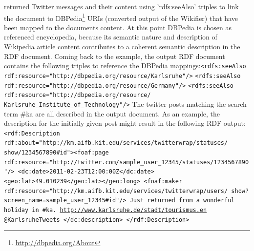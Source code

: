 \documentclass{llncs}
\begin{document}
\begin{enumerate}
returned Twitter messages and their content using 'rdfs:seeAlso' triples to link
the document to DBPedia\footnote{\url{http://dbpedia.org/About}} URIs (converted
output of the Wikifier) that have been mapped to the documents content.
At this point DBPedia is chosen as referenced encyclopedia, because its
semantic nature and description of Wikipedia article content contributes to a
coherent semantic description in the RDF document. \newline\linebreak Coming
back to the example, the output RDF document contains the following triples to reference the
DBPedia mappings:\newline\linebreak \texttt{<rdfs:seeAlso
rdf:resource="http://dbpedia.org/resource/Karlsruhe"/>}\newline
\texttt{<rdfs:seeAlso
rdf:resource="http://dbpedia.org/resource/Germany"/>}\newline
\texttt{<rdfs:seeAlso rdf:resource="http://dbpedia.org/resource/\newline
Karlsruhe\_Institute\_of\_Technology"/>}\newline\linebreak 
The twitter posts matching the search term \#ka are all described in the output
document. As an example, the description for the initially given post might
result in the following RDF output:\newline\linebreak
\texttt{<rdf:Description
rdf:about="http://km.aifb.kit.edu/services/twitterwrap/statuses/\newline
show/1234567890\#id">\newline <foaf:page
rdf:resource="http://twitter.com/sample\_user\_12345/statuses/1234567890"/>\newline
<dc:date>2011-02-23T12:00:00Z</dc:date>\newline
<geo:lat>49.010239</geo:lat></geo:long>\newline
<foaf:maker
rdf:resource="http://km.aifb.kit.edu/services/twitterwrap/users/\newline
show?screen\_name=sample\_user\_12345\#id"/>\newline
Just returned from a wonderful holiday in \#ka.
\url{http://www.karlsruhe.de/stadt/tourismus.en} @KarlsruheTweets\newline
</dc:description>\newline
</rdf:Description>\newline}
\end{enumerate}
\end{document}
